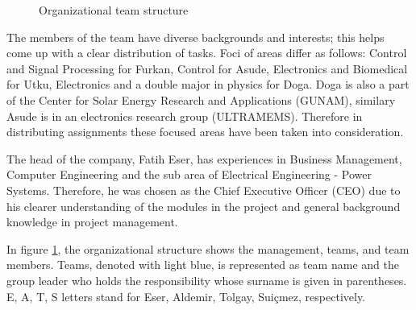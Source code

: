 \begin{figure}[htp]

\caption{Organizational team structure}
\label{fig:organizational_structure}
\end{figure}

The members of the team have diverse backgrounds and interests; this helps come up with a clear distribution of tasks. Foci of areas differ as follows: Control and Signal Processing for Furkan, Control for Asude, Electronics and Biomedical for Utku, Electronics and a double major in physics for Doga. Doga is also a part of the Center for Solar Energy Research and Applications (GUNAM), similary Asude is in an electronics research group (ULTRAMEMS). Therefore in distributing assignments these focused areas have been taken into consideration. 

The head of the company, Fatih Eser, has experiences in Business Management, Computer Engineering and the sub area of Electrical Engineering - Power Systems. Therefore, he was chosen as the Chief Executive Officer (CEO) due to his clearer understanding of the modules in the project and general background knowledge in project management.

In figure \ref{fig:organizational_structure}, the organizational structure shows the management, teams, and team members. Teams, denoted with light blue, is represented as team name and the group leader who holds the responsibility whose surname is given in parentheses. E, A, T, S letters stand for Eser, Aldemir, Tolgay, Suiçmez, respectively.

